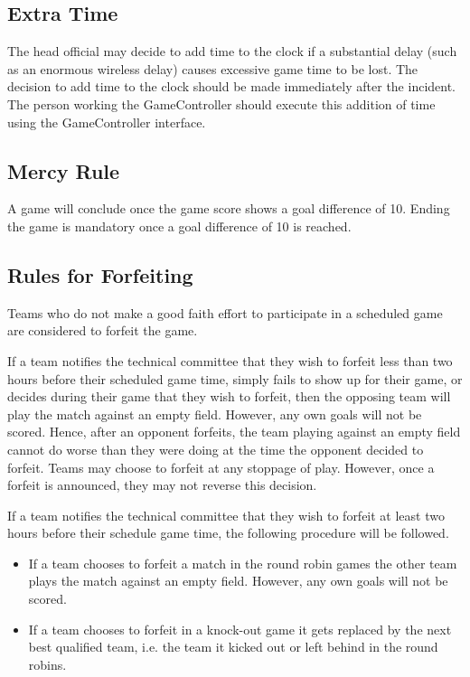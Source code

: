 \documentclass[12pt]{article}
\begin{document}
\subsection{Extra Time}
\label{sec:extra_time}
The head official may decide to add time to the clock if a substantial delay (such as an enormous wireless delay) causes excessive game time to be lost.  The decision to add time to the clock should be made immediately after the incident.  The person working the GameController should execute this addition of time using the GameController interface.

\subsection{Mercy Rule}
\label{sec:mercy_rule}
A game will conclude once the game score shows a goal difference of 10.  Ending the game is mandatory once a goal difference of 10 is reached.

\subsection{Rules for Forfeiting}
\label{sec:forfeit}

Teams who do not make a good faith effort to participate in a scheduled game are considered to forfeit the game.

If a team notifies the technical committee that they wish to forfeit less than two hours before their scheduled game time, simply fails to show up for their game, or decides during their game that they wish to forfeit, then the opposing team will play the match against an empty field.  However, any own goals will not be scored.  Hence, after an opponent forfeits, the team playing against an empty field cannot do worse than they were doing at the time the opponent decided to forfeit.  Teams may choose to forfeit at any stoppage of play.  However, once a forfeit is announced, they may not reverse this decision.

If a team notifies the technical committee that they wish to forfeit at least two hours before their schedule game time, the following procedure will be followed.

\begin{itemize}
\item If a team chooses to forfeit a match in the round robin games the other team plays the match against an empty field.  However, any own goals will not be scored.
\item If a team chooses to forfeit in a knock-out game it gets replaced by the next best qualified team, i.e. the team it kicked out or left behind in the round robins.
\end{itemize}
\end{document}
